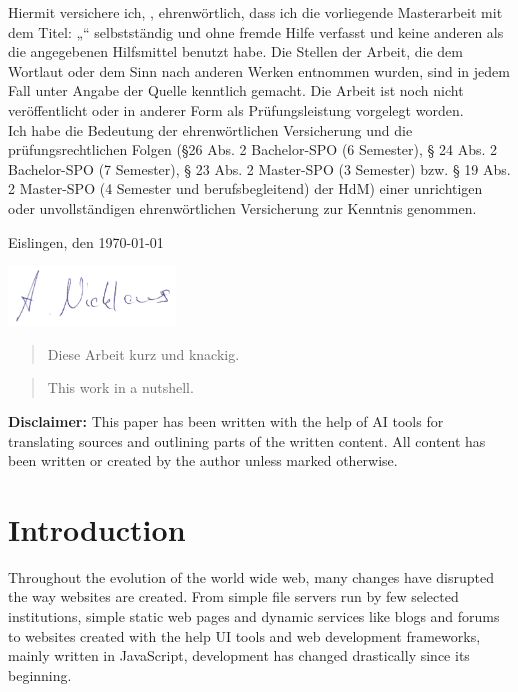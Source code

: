 \documentclass[a4paper, 12pt]{article}
\makeatletter
\let\Title\@title
\let\Author\@author
\makeatother
\begin{document}
	Hiermit versichere ich, \Author, ehrenwörtlich, dass ich die
	vorliegende Masterarbeit mit dem Titel: „\Title“ selbstständig und ohne fremde Hilfe verfasst und keine
	anderen als die angegebenen Hilfsmittel benutzt habe. Die Stellen der Arbeit, die dem
	Wortlaut oder dem Sinn nach anderen Werken entnommen wurden, sind in jedem Fall
	unter Angabe der Quelle kenntlich gemacht. Die Arbeit ist noch nicht veröffentlicht oder
	in anderer Form als Prüfungsleistung vorgelegt worden.\\
	
	Ich habe die Bedeutung der ehrenwörtlichen Versicherung und die prüfungsrechtlichen
	Folgen (§26 Abs. 2 Bachelor-SPO (6 Semester), § 24 Abs. 2 Bachelor-SPO (7 Semester), §
	23 Abs. 2 Master-SPO (3 Semester) bzw. § 19 Abs. 2 Master-SPO (4 Semester und
	berufsbegleitend) der HdM) einer unrichtigen oder unvollständigen ehrenwörtlichen
	Versicherung zur Kenntnis genommen.
	\vspace{30px}
	
	Eislingen, den \today
	\vspace{20px}
	
	\includegraphics[height=60px]{img/unterschrift.png}
	\vspace{10px}
	
	\Author

\pagebreak

\begin{abstract}
  Diese Arbeit kurz und knackig.
\end{abstract}

\begin{abstract}
  This work in a nutshell.
\end{abstract}

\vfill

\noindent\textbf{Disclaimer:} This paper has been written with the help of AI tools for translating sources and outlining parts of the written content.
All content has been written or created by the author unless marked otherwise.

\pagebreak

\tableofcontents
\pagebreak

\section{Introduction}\label{sec:introduction}
Throughout the evolution of the world wide web, many changes have disrupted the way websites are created.
From simple file servers run by few selected institutions, simple static web pages and dynamic services like blogs and forums to websites created with the help UI tools and web development frameworks, mainly written in JavaScript, development has changed drastically since its beginning.
\end{document}
